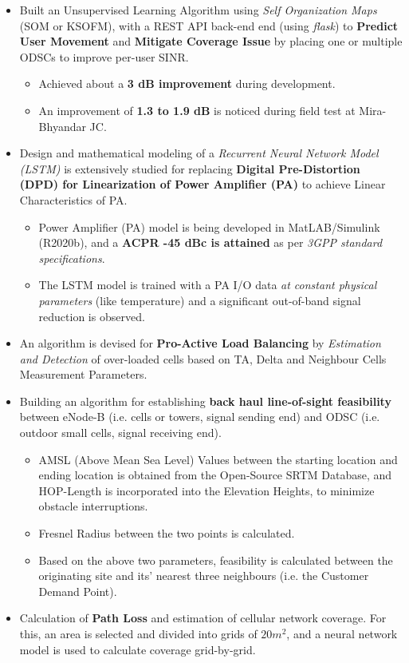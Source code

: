 \begin{itemize}
	\item Built an Unsupervised Learning Algorithm using \textit{Self Organization Maps} (SOM or KSOFM), with a REST API back-end end (using \textit{flask}) to \textbf{Predict User Movement} and \textbf{Mitigate Coverage Issue} by placing one or multiple ODSCs to improve per-user SINR.
	\begin{itemize}
		\item Achieved about a \textbf{3 dB improvement} during development.
		\item An improvement of \textbf{1.3 to 1.9 dB} is noticed during field test at Mira-Bhyandar JC.
	\end{itemize}

	\item Design and mathematical modeling of a \textit{Recurrent Neural Network Model (LSTM)} is extensively studied for replacing \textbf{Digital Pre-Distortion (DPD) for Linearization of Power Amplifier (PA)} to achieve Linear Characteristics of PA.
	\begin{itemize}
		\item Power Amplifier (PA) model is being developed in MatLAB/Simulink (R2020b), and a \textbf{ACPR -45 dBc is attained} as per \textit{3GPP standard specifications}.
		\item The LSTM model is trained with a PA I/O data \textit{at constant physical parameters} (like temperature) and a significant out-of-band signal reduction is observed.
	\end{itemize}

	\item An algorithm is devised for \textbf{Pro-Active Load Balancing} by \textit{Estimation and Detection} of over-loaded cells based on TA, Delta and Neighbour Cells Measurement Parameters.

	\item Building an algorithm for establishing \textbf{back haul line-of-sight feasibility} between eNode-B (i.e. cells or towers, signal sending end) and ODSC (i.e. outdoor small cells, signal receiving end).

	\begin{itemize}
		\item AMSL (Above Mean Sea Level) Values between the starting location and ending location is obtained from the Open-Source SRTM Database, and HOP-Length is incorporated into the Elevation Heights, to minimize obstacle interruptions.

		\item Fresnel Radius between the two points is calculated.

		\item Based on the above two parameters, feasibility is calculated between the originating site and its’ nearest three neighbours (i.e. the Customer Demand Point).
	\end{itemize}

	\item Calculation of \textbf{Path Loss} and estimation of cellular network coverage. For this, an area is selected and divided into grids of $20 m^2$, and a neural network model is used to calculate coverage grid-by-grid.
\end{itemize}

